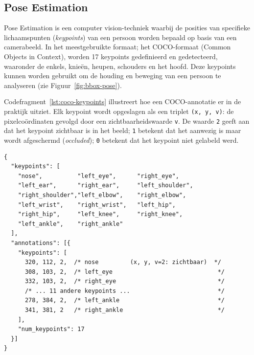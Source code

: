 \subsection{Pose Estimation}
\label{subsec:pose-estimation}

Pose Estimation is een computer vision-techniek waarbij de posities van specifieke lichaamspunten (\textit{keypoints}) van een persoon worden bepaald op basis van een camerabeeld. In het meestgebruikte formaat; het COCO-formaat (Common Objects in Context), worden 17 keypoints gedefinieerd en gedetecteerd, waaronder de enkels, knieën, heupen, schouders en het hoofd. Deze keypoints kunnen worden gebruikt om de houding en beweging van een persoon te analyseren (zie Figuur~\ref{fig:bbox-pose}).

Codefragment~\ref{lst:coco-keypoints} illustreert hoe een COCO-annotatie er in de praktijk uitziet. Elk keypoint wordt opgeslagen als een triplet \texttt{(x,~y,~v)}: de pixelco{\"o}rdinaten gevolgd door een zichtbaarheidswaarde \texttt{v}. De waarde \texttt{2} geeft aan dat het keypoint zichtbaar is in het beeld; \texttt{1} betekent dat het aanwezig is maar wordt afgeschermd (\textit{occluded}); \texttt{0} betekent dat het keypoint niet gelabeld werd.

\begin{listing}[ht]
    \begin{verbatim}
{
  "keypoints": [
    "nose",          "left_eye",      "right_eye",
    "left_ear",      "right_ear",     "left_shoulder",
    "right_shoulder","left_elbow",    "right_elbow",
    "left_wrist",    "right_wrist",   "left_hip",
    "right_hip",     "left_knee",     "right_knee",
    "left_ankle",    "right_ankle"
  ],
  "annotations": [{
    "keypoints": [
      320, 112, 2,  /* nose         (x, y, v=2: zichtbaar)  */
      308, 103, 2,  /* left_eye                              */
      332, 103, 2,  /* right_eye                             */
      /* ... 11 andere keypoints ...                         */
      278, 384, 2,  /* left_ankle                            */
      341, 381, 2   /* right_ankle                           */
    ],
    "num_keypoints": 17
  }]
}
\end{verbatim}
    \caption[COCO keypointannotatie]{Structuur van een COCO-annotatie. Elk keypoint bestaat uit drie waarden \texttt{(x,~y,~v)}: pixelco{\"o}rdinaten en een zichtbaarheidswaarde \texttt{v} (0~=~niet gelabeld, 1~=~occluded, 2~=~zichtbaar). De volledige array telt 51 waarden (17 keypoints $\times$ 3).}
    \label{lst:coco-keypoints}
\end{listing}

